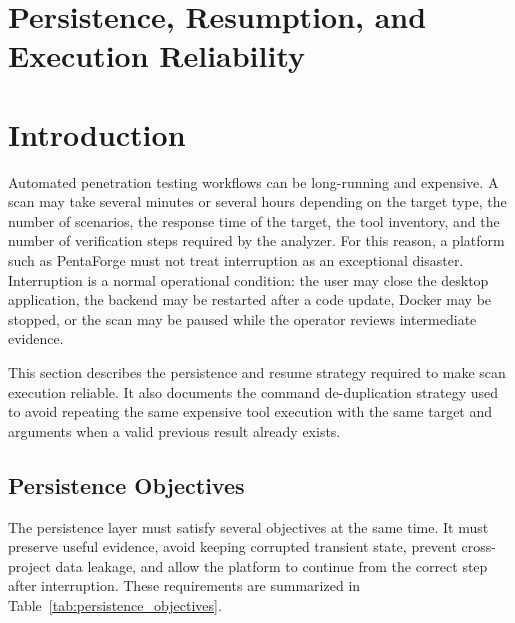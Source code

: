 \documentclass[12pt,a4paper]{report}
\begin{document}
\section{Persistence, Resumption, and Execution Reliability}

\section*{Introduction}

Automated penetration testing workflows can be long-running and expensive. A scan may
take several minutes or several hours depending on the target type, the number of
scenarios, the response time of the target, the tool inventory, and the number of
verification steps required by the analyzer. For this reason, a platform such as
PentaForge must not treat interruption as an exceptional disaster. Interruption is a
normal operational condition: the user may close the desktop application, the backend
may be restarted after a code update, Docker may be stopped, or the scan may be paused
while the operator reviews intermediate evidence.

This section describes the persistence and resume strategy required to make scan
execution reliable. It also documents the command de-duplication strategy used to avoid
repeating the same expensive tool execution with the same target and arguments when a
valid previous result already exists.

\subsection{Persistence Objectives}

The persistence layer must satisfy several objectives at the same time. It must preserve
useful evidence, avoid keeping corrupted transient state, prevent cross-project data
leakage, and allow the platform to continue from the correct step after interruption.
These requirements are summarized in Table~\ref{tab:persistence_objectives}.
\end{document}
